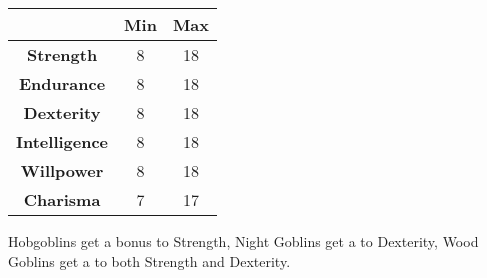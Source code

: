 \documentclass[openany,10pt,a4paper]{book}
\begin{document}
\begin{tabular}{|c|c|c|}
\hline
 & \textbf{Min} & \textbf{Max} \\ \hline
\textbf{Strength} & 8 & 18 \\ \hline
\textbf{Endurance} & 8 & 18 \\ \hline
\textbf{Dexterity} & 8 & 18 \\ \hline
\textbf{Intelligence} & 8 & 18 \\ \hline
\textbf{Willpower} & 8 & 18 \\ \hline
\textbf{Charisma} & 7 & 17 \\ \hline
\end{tabular}\newline
Hobgoblins get a  bonus to Strength, Night Goblins get a  to Dexterity, Wood Goblins get a  to both Strength and Dexterity. \newpage
\end{document}
